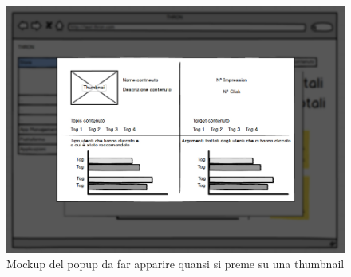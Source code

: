 \documentclass[a4paper, 12pt, twoside, openright]{book}
\begin{document}
\begin{figure}[H]
	\centering
	\label{grafico-qualitativo-2-mockup}	\includegraphics[width=1.0\textwidth]{images/grafico-qualitativo-2-mockup.jpg}
	\caption{Mockup del popup da far apparire quansi si preme su una thumbnail}
\end{figure} 
\end{document}
